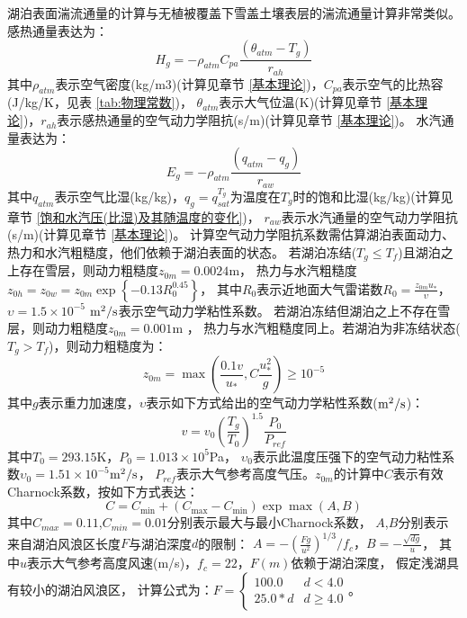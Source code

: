 湖泊表面湍流通量的计算与无植被覆盖下雪盖土壤表层的湍流通量计算非常类似。感热通量表达为：
\begin{equation}
H_{g}=-\rho_{atm} C_{p a} \frac{\left(\theta_{atm}-T_{g}\right)}{r_{a h}}
\end{equation}
其中$\rho_{atm}$表示空气密度(kg/m3)(计算见章节 \ref{基本理论})，$C_{pa}$表示空气的比热容(J/kg/K，见表 \ref{tab:物理常数})，
$\theta_{atm}$表示大气位温(K)(计算见章节 \ref{基本理论})，$r_{ah}$表示感热通量的空气动力学阻抗(s/m)(计算见章节 \ref{基本理论})。
水汽通量表达为：
\begin{equation}
E_{g}=-\rho_{atm} \frac{\left(q_{atm}-q_{g}\right)}{r_{a w}}
\end{equation}
其中$q_{atm}$表示空气比湿(kg/kg)，$q_g=q_{sat}^{T_g}$为温度在$T_g$时的饱和比湿(kg/kg)(计算见章节 \ref{饱和水汽压(比湿)及其随温度的变化})，
$r_{aw}$表示水汽通量的空气动力学阻抗(s/m)(计算见章节 \ref{基本理论})。
计算空气动力学阻抗系数需估算湖泊表面动力、热力和水汽粗糙度，他们依赖于湖泊表面的状态。
若湖泊冻结($T_g\le T_f$)且湖泊之上存在雪层，则动力粗糙度$z_{0m}=0.0024$m，
热力与水汽粗糙度$z_{0h}=z_{0w}=z_{0m}\exp{\left\{-0.13R_0^{0.45}\right\}}$\citep{zilitinkevich1972dynamics}，
其中$R_0$表示近地面大气雷诺数$R_0=\frac{z_{0m}u_\ast}{\upsilon}$，
$\upsilon=1.5\times{10}^{-5}$ $\rm m^2/s$表示空气动力学粘性系数。
若湖泊冻结但湖泊之上不存在雪层，则动力粗糙度$z_{0m}=0.001$m \citep{subin2012improved}，
热力与水汽粗糙度同上。若湖泊为非冻结状态($T_g>T_f$)，则动力粗糙度为\citep{subin2012improved}：
\begin{equation}
z_{0 m}=\max \left(\frac{0.1 v}{u_{*}}, C \frac{u_{*}^{2}}{g}\right) \geq 10^{-5}
\end{equation}
其中$g$表示重力加速度，$\upsilon$表示如下方式给出的空气动力学粘性系数($\rm m^2/s$)：
\begin{equation}
v=v_{0}\left(\frac{T_{g}}{T_{0}}\right)^{1.5} \frac{P_{0}}{P_{r e f}}
\end{equation}
其中$T_0=293.15$K，$P_0=1.013\times{10}^5$Pa，
$\upsilon_0$表示此温度压强下的空气动力粘性系数$\upsilon_0=1.51\times{10}^{-5}$$\rm m^2/s$，
$P_{ref}$表示大气参考高度气压。$z_{0m}$的计算中$C$表示有效Charnock系数，按如下方式表达：
\begin{equation}
C=C_{\min }+\left(C_{\max }-C_{\min }\right) \exp \max (A, B)
\end{equation}
其中$C_{max}=0.11$,$C_{min}=0.01$分别表示最大与最小Charnock系数，
$A$,$B$分别表示来自湖泊风浪区长度$F$与湖泊深度$d$的限制：
$A=-\left(\frac{Fg}{u^2}\right)^{1/3}/f_c，B=-\frac{\sqrt{dg}}{u}$，
其中$u$表示大气参考高度风速(m/s)，$f_c=22$，$F(m)$依赖于湖泊深度，
假定浅湖具有较小的湖泊风浪区，
计算公式为：$F=\left\{\begin{array}{ll}100.0 & d<4.0 \\ 25.0 * d & d \geq 4.0\end{array}\right.$。


